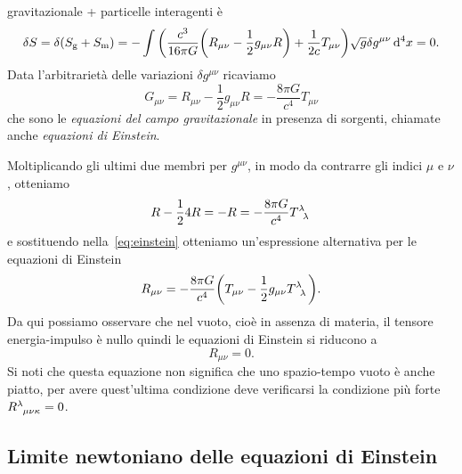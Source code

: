 gravitazionale + particelle interagenti è
\begin{equation}
  \delta S = \delta(S_{\textup{g}} + S_{\textup{m}}) = -\int \bigg(
  \frac{c^{3}}{16\pi G} \bigg( R_{\mu\nu} - \frac{1}{2} g_{\mu\nu} R \bigg) +
  \frac{1}{2c} T_{\mu\nu} \bigg) \sqrt{g} \delta g^{\mu\nu} \mathop{}\!\mathrm{d}^{4} x = 0.
\end{equation}
Data l'arbitrarietà delle variazioni $\delta g^{\mu\nu}$ ricaviamo
\begin{equation}
  \label{eq:einstein}
  G_{\mu\nu} = R_{\mu\nu} - \frac{1}{2} g_{\mu\nu} R = -\frac{8\pi G}{c^{4}}
  T_{\mu\nu}
\end{equation}
che sono le \emph{equazioni del campo gravitazionale} in presenza di sorgenti,
chiamate anche \emph{equazioni di Einstein}.

Moltiplicando gli ultimi due membri per $g^{\mu\nu}$, in modo da contrarre gli
indici $\mu$ e $\nu$, otteniamo
\begin{equation}
  R - \frac{1}{2}4R = -R = -\frac{8\pi G}{c^{4}}\tensor{T}{^{\lambda}_{\lambda}}
\end{equation}
e sostituendo nella~\eqref{eq:einstein} otteniamo un'espressione alternativa per
le equazioni di Einstein
\begin{equation}
  R_{\mu\nu} = -\frac{8\pi G}{c^{4}} \bigg( T_{\mu\nu} -
  \frac{1}{2}g_{\mu\nu}\tensor{T}{^{\lambda}_{\lambda}} \bigg).
\end{equation}
Da qui possiamo osservare che nel vuoto, cioè in assenza di materia, il tensore
energia-impulso è nullo quindi le equazioni di
Einstein si riducono a
\begin{equation}
  R_{\mu\nu} = 0.
\end{equation}
Si noti che questa equazione non significa che uno spazio-tempo vuoto è anche
piatto, per avere quest'ultima condizione deve verificarsi la condizione più
forte $\tensor{R}{^{\lambda}_{\mu\nu\kappa}} = 0$.

\subsection{Limite newtoniano delle equazioni di Einstein}
\label{sec:limite-newtoniano-einstein}

